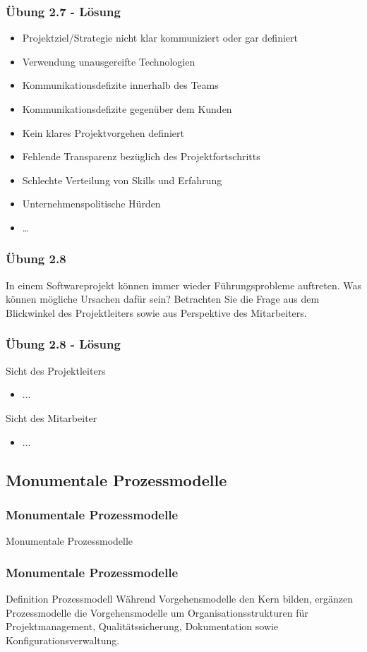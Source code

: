 \ifloesung
\begin{frame}[fragile]
\frametitle{Übung 2.7 - Lösung}
	\begin{itemize}
		\item Projektziel/Strategie nicht klar kommuniziert oder gar definiert
		\item Verwendung unausgereifte Technologien
		\item Kommunikationsdefizite innerhalb des Teams 
		\item Kommunikationsdefizite gegenüber dem Kunden
		\item Kein klares Projektvorgehen definiert
		\item Fehlende Transparenz bezüglich des Projektfortschritts
		\item Schlechte Verteilung von Skills und Erfahrung
		\item Unternehmenspolitische Hürden
		\item \ldots
	\end{itemize}
\end{frame}
\fi

\begin{frame}
\frametitle{Übung 2.8}
	In einem Softwareprojekt können immer wieder Führungsprobleme auftreten.
	Was können mögliche Ursachen dafür sein? Betrachten Sie die Frage aus dem 
	Blickwinkel des Projektleiters sowie aus Perspektive des Mitarbeiters.
\end{frame}

\ifloesung
\begin{frame}[fragile]
\frametitle{Übung 2.8 - Lösung}
	Sicht des Projektleiters
	\begin{itemize}
		\item ...
	\end{itemize}
	\bigskip
	Sicht des Mitarbeiter
	\begin{itemize}
		\item ...
	\end{itemize}
\end{frame}
\fi

\subsection{Monumentale Prozessmodelle}
\begin{frame}
\frametitle{Monumentale Prozessmodelle}
\huge Monumentale Prozessmodelle
\end{frame}

\begin{frame}
\frametitle{Monumentale Prozessmodelle}
	\begin{block}{Definition Prozessmodell}
		Während Vorgehensmodelle den Kern bilden, ergänzen Prozessmodelle die Vorgehensmodelle um 
		Organisationsstrukturen für Projektmanagement, Qualitätssicherung, Dokumentation sowie 
		Konfigurationsverwaltung.
	\end{block}
\end{frame}

